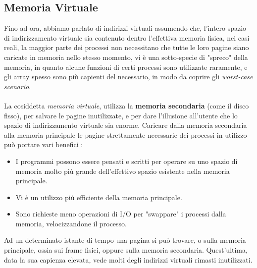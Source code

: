 \documentclass[12pt, letterpaper]{article}
\newcommand{\acc}{\\\hphantom{}\\}
\begin{document}
\subsection{Memoria Virtuale}
Fino ad ora, abbiamo parlato di indirizzi virtuali assumendo che, l'intero spazio di indirizzamento virtuale sia 
contenuto dentro l'effettiva memoria fisica, nei casi reali, la maggior parte dei processi non necessitano che tutte 
le loro pagine siano caricate in memoria nello stesso momento, vi è una sotto-specie di "spreco" della memoria, in quanto 
alcune funzioni di certi processi sono utilizzate raramente, e gli array spesso sono più capienti del necessario, in modo 
da coprire gli \textit{worst-case scenario}.\acc  La cosiddetta \textit{memoria virtuale}, utilizza la \textbf{memoria 
secondaria} (come il disco fisso), per salvare le pagine inutilizzate, e per dare l'illusione all'utente che lo spazio 
di indirizzamento virtuale sia enorme. Caricare dalla memoria secondaria alla memoria principale le pagine 
strettamente necessarie dei processi in utilizzo può portare vari benefici : \begin{itemize}
    \item I programmi possono essere pensati e scritti per operare su uno spazio di memoria molto più grande 
    dell'effettivo spazio esistente nella memoria principale.
    \item Vi è un utilizzo più efficiente della memoria principale.
    \item Sono richieste meno operazioni di I/O per "swappare" i processi dalla memoria, velocizzandone il processo.
\end{itemize}
Ad un determinato istante di tempo una pagina si può trovare, o sulla memoria principale, ossia sui frame fisici, oppure 
sulla memoria secondaria. Quest'ultima, data la sua capienza elevata, vede molti degli indirizzi virtuali 
rimasti inutilizzati.
\end{document}
